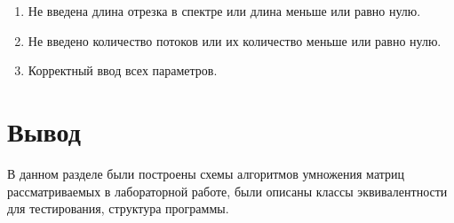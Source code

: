 \begin{enumerate}
	\item Не введена длина отрезка в спектре или длина меньше или равно нулю.
	\item Не введено количество потоков или их количество меньше или равно нулю.
	\item Корректный ввод всех параметров.
\end{enumerate}


\section{Вывод}

В данном разделе были построены схемы алгоритмов умножения матриц рассматриваемых в лабораторной работе, были описаны классы эквивалентности для тестирования, структура программы.
